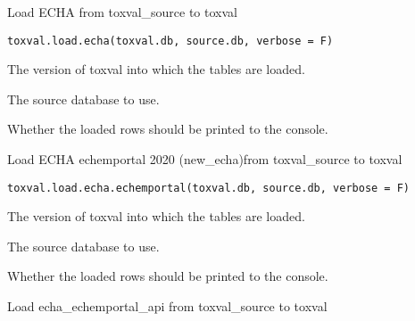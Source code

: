 \documentclass[letterpaper]{book}
\begin{document}
%
\begin{Description}\relax
Load ECHA from toxval\_source to toxval
\end{Description}
%
\begin{Usage}
\begin{verbatim}
toxval.load.echa(toxval.db, source.db, verbose = F)
\end{verbatim}
\end{Usage}
%
\begin{Arguments}
\begin{ldescription}
\item[\code{toxval.db}] The version of toxval into which the tables are loaded.

\item[\code{source.db}] The source database to use.

\item[\code{verbose}] Whether the loaded rows should be printed to the console.
\end{ldescription}
\end{Arguments}
%
\begin{Description}\relax
Load ECHA echemportal 2020 (new\_echa)from toxval\_source to toxval
\end{Description}
%
\begin{Usage}
\begin{verbatim}
toxval.load.echa.echemportal(toxval.db, source.db, verbose = F)
\end{verbatim}
\end{Usage}
%
\begin{Arguments}
\begin{ldescription}
\item[\code{toxval.db}] The version of toxval into which the tables are loaded.

\item[\code{source.db}] The source database to use.

\item[\code{verbose}] Whether the loaded rows should be printed to the console.
\end{ldescription}
\end{Arguments}
%
\begin{Description}\relax
Load echa\_echemportal\_api from toxval\_source to toxval
\end{Description}
\end{document}

